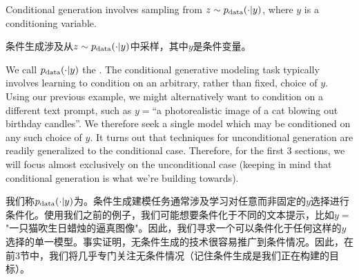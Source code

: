 \begin{ideabox}
    Conditional generation involves sampling from $z\sim p_{\rm{data}}(\cdot | y)$, where $y$ is a conditioning variable.
    
    条件生成涉及从$z\sim p_{\rm{data}}(\cdot | y)$中采样，其中$y$是条件变量。
\end{ideabox}
We call $p_{\rm{data}}(\cdot|y)$ the . The conditional generative modeling task typically involves learning to condition on an arbitrary, rather than fixed, choice of $y$. Using our previous example, we might alternatively want to condition on a different text prompt, such as $y=$``a photorealistic image of a cat blowing out birthday candles''. We therefore seek a single model which may be conditioned on any such choice of $y$. It turns out that techniques for unconditional generation are readily generalized to the conditional case. Therefore, for the first 3 sections, we will focus almost exclusively on the unconditional case (keeping in mind that conditional generation is what we're building towards).

我们称$p_{\rm{data}}(\cdot|y)$为。条件生成建模任务通常涉及学习对任意而非固定的$y$选择进行条件化。使用我们之前的例子，我们可能想要条件化于不同的文本提示，比如$y=$"一只猫吹生日蜡烛的逼真图像"。因此，我们寻求一个可以条件化于任何这样的$y$选择的单一模型。事实证明，无条件生成的技术很容易推广到条件情况。因此，在前3节中，我们将几乎专门关注无条件情况（记住条件生成是我们正在构建的目标）。



